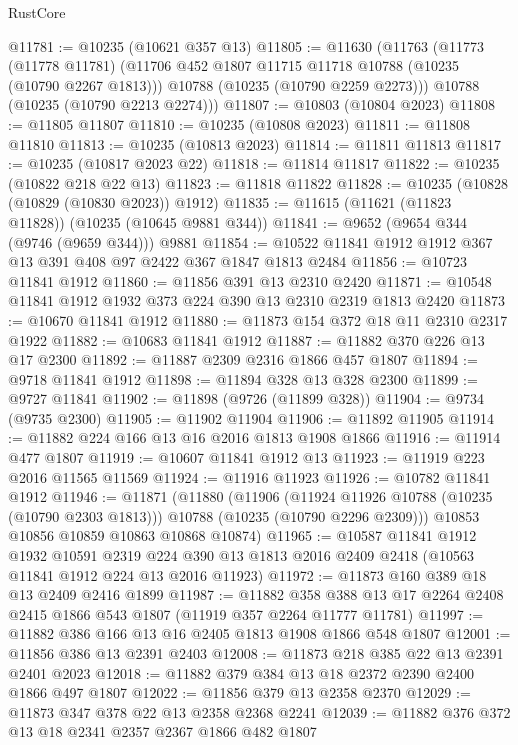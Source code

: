 \begin{lexlean}{RustCore}
\begin{coremodule}
@11781 := @10235 (@10621 @357 @13)
@11805 := @11630
    (@11763
      (@11773
        (@11778 @11781)
        (@11706 @452 @1807 @11715 @11718 @10788 (@10235 (@10790 @2267 @1813)))
        @10788
        (@10235 (@10790 @2259 @2273)))
      @10788
      (@10235 (@10790 @2213 @2274)))
@11807 := @10803 (@10804 @2023)
@11808 := @11805 @11807
@11810 := @10235 (@10808 @2023)
@11811 := @11808 @11810
@11813 := @10235 (@10813 @2023)
@11814 := @11811 @11813
@11817 := @10235 (@10817 @2023 @22)
@11818 := @11814 @11817
@11822 := @10235 (@10822 @218 @22 @13)
@11823 := @11818 @11822
@11828 := @10235 (@10828 (@10829 (@10830 @2023)) @1912)
@11835 := @11615 (@11621 (@11823 @11828)) (@10235 (@10645 @9881 @344))
@11841 := @9652 (@9654 @344 (@9746 (@9659 @344))) @9881
@11854 := @10522 @11841 @1912 @1912 @367 @13 @391 @408 @97 @2422 @367 @1847 @1813 @2484
@11856 := @10723 @11841 @1912
@11860 := @11856 @391 @13 @2310 @2420
@11871 := @10548 @11841 @1912 @1932 @373 @224 @390 @13 @2310 @2319 @1813 @2420
@11873 := @10670 @11841 @1912
@11880 := @11873 @154 @372 @18 @11 @2310 @2317 @1922
@11882 := @10683 @11841 @1912
@11887 := @11882 @370 @226 @13 @17 @2300
@11892 := @11887 @2309 @2316 @1866 @457 @1807
@11894 := @9718 @11841 @1912
@11898 := @11894 @328 @13 @328 @2300
@11899 := @9727 @11841
@11902 := @11898 (@9726 (@11899 @328))
@11904 := @9734 (@9735 @2300)
@11905 := @11902 @11904
@11906 := @11892 @11905
@11914 := @11882 @224 @166 @13 @16 @2016 @1813 @1908 @1866
@11916 := @11914 @477 @1807
@11919 := @10607 @11841 @1912 @13
@11923 := @11919 @223 @2016 @11565 @11569
@11924 := @11916 @11923
@11926 := @10782 @11841 @1912
@11946 := @11871
    (@11880
      (@11906
        (@11924 @11926 @10788 (@10235 (@10790 @2303 @1813)))
        @10788
        (@10235 (@10790 @2296 @2309)))
      @10853
      @10856
      @10859
      @10863
      @10868
      @10874)
@11965 := @10587
    @11841
    @1912
    @1932
    @10591
    @2319
    @224
    @390
    @13
    @1813
    @2016
    @2409
    @2418
    (@10563 @11841 @1912 @224 @13 @2016 @11923)
@11972 := @11873 @160 @389 @18 @13 @2409 @2416 @1899
@11987 := @11882
    @358
    @388
    @13
    @17
    @2264
    @2408
    @2415
    @1866
    @543
    @1807
    (@11919 @357 @2264 @11777 @11781)
@11997 := @11882 @386 @166 @13 @16 @2405 @1813 @1908 @1866 @548 @1807
@12001 := @11856 @386 @13 @2391 @2403
@12008 := @11873 @218 @385 @22 @13 @2391 @2401 @2023
@12018 := @11882 @379 @384 @13 @18 @2372 @2390 @2400 @1866 @497 @1807
@12022 := @11856 @379 @13 @2358 @2370
@12029 := @11873 @347 @378 @22 @13 @2358 @2368 @2241
@12039 := @11882 @376 @372 @13 @18 @2341 @2357 @2367 @1866 @482 @1807

\end{coremodule}
\end{lexlean}
